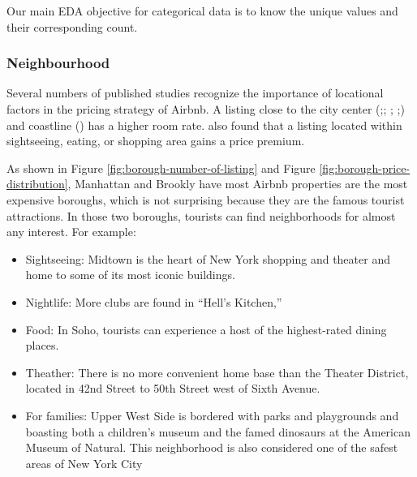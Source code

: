 Our main EDA objective for categorical data is to know the unique values and
their corresponding count.

\subsubsection*{Neighbourhood}
\label{eda:neighbourhood}

Several numbers of published studies recognize the importance of locational
factors in the pricing strategy of Airbnb.  A listing close to the city center
(\cite{gibbs2018use};\cite{li2016pros}; \cite{wang2017price};
\cite{zhang2017key};\cite{gibbs2018use}) and coastline (\cite{perez2018and}) has
a higher room rate.  \cite{perez2018and} also found that a listing located
within sightseeing, eating, or shopping area gains a price premium.

As shown in Figure \ref{fig:borough-number-of-listing} and Figure
\ref{fig:borough-price-distribution}, Manhattan and Brookly have most Airbnb
properties are the most expensive boroughs, which is not surprising because they
are the famous tourist attractions.  In those two boroughs, tourists can find
neighborhoods for almost any interest. For example:

\begin{itemize}
  \item Sightseeing: Midtown is the heart of New York shopping and theater and
    home to some of its most iconic buildings.
  \item Nightlife:  More clubs are found in “Hell’s Kitchen,”
  \item Food: In Soho, tourists can experience a host of the highest-rated
    dining places.
  \item Theather: There is no more convenient home base than
    the Theater District,  located in 42nd Street to 50th Street west of Sixth
    Avenue.
  \item For families: Upper West Side is bordered with parks and playgrounds and
  boasting both a children’s museum and the famed dinosaurs at the American Museum
  of Natural. This neighborhood is also considered one of the safest areas of New
  York City
\end{itemize}



